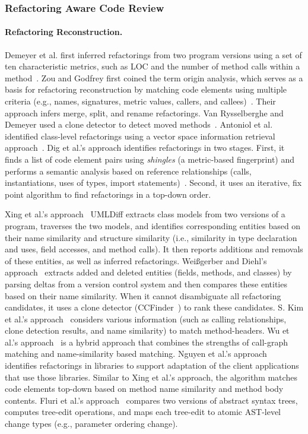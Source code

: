 \documentclass[runningheads,a4paper]{llncs}
\begin{document}
\subsubsection{Refactoring Aware Code Review} 

\paragraph{Refactoring Reconstruction.}  
Demeyer {et al.} first inferred refactorings from two program versions using a set of ten characteristic metrics, such as LOC and the number of method calls within a method~\cite{Demeyer2000}. Zou and Godfrey first coined the term origin analysis, which serves as a basis for refactoring reconstruction by matching code elements using multiple criteria (e.g., names, signatures, metric values, callers, and callees)~\cite{Zou2005}. Their approach infers merge, split, and rename refactorings. Van Rysselberghe and Demeyer used a clone detector to detect moved methods~\cite{Rysselberghe2003}.  Antoniol {et al.} identified class-level refactorings using a vector space information retrieval approach~\cite{Antoniol2004}.  Dig et al.'s approach identifies refactorings in two stages. First, it finds a list of code element pairs using {\em shingles} (a metric-based fingerprint) and performs a semantic analysis based on reference relationships (calls, instantiations, uses of types, import statements)~\cite{Dig2006}. Second, it uses an iterative, fix point algorithm to find refactorings in a top-down order.  


Xing et al.'s approach~\cite{Xing2005} UMLDiff extracts class models from two versions of a program, traverses the two models, and identifies corresponding entities based on their {name similarity} and {structure similarity} {(i.e., similarity in type declaration and uses, field accesses, and method calls)}. It then reports additions and removals of these entities, as well as inferred refactorings. Wei{\ss}gerber and Diehl's approach~\cite{Weissgerber2006} extracts added and deleted entities (fields, methods, and classes) by parsing deltas from a version control system and then compares these entities based on their {name similarity}. When it cannot disambiguate all refactoring candidates, it uses a {clone detector} (CCFinder~\cite{Kamiya2002}) to rank these candidates. S. Kim et al.'s approach~\cite{SKim2005} considers various information (such as {calling relationships}, {clone detection} results, and {name similarity}) to match method-headers.  Wu et al.'s approach~\cite{Wu2010:aura} is a hybrid approach that combines the strengths of {call-graph matching} and {name-similarity} based matching. Nguyen et al.'s approach~\cite{Nguyen2010:libsync} identifies refactorings in libraries to support adaptation of the client applications that use those libraries. Similar to Xing et al.'s approach, the algorithm matches code elements top-down based on method name similarity and method body contents. Fluri et al.'s approach~\cite{Fluri2007} compares two versions of abstract syntax trees, computes tree-edit operations, and maps each tree-edit to atomic AST-level change types (e.g., parameter ordering change).
\end{document}
